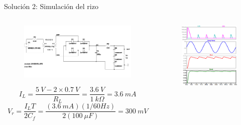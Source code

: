 \documentclass[t,aspectratio=169]{beamer}
\begin{document}
\begin{frame}{Solución 2: Simulación del rizo}
\begin{columns}
\begin{column}{0.6\textwidth}
    \begin{figure}
        \centering
        \includegraphics[width=\textwidth]{figures/fullwave_rectifier_schematic.pdf}
    \end{figure}
    \[ I_{L} = \dfrac{5\ V - 2\times{}0.7\ V}{R_L} = \dfrac{3.6\ V}{1\ k\Omega} = 3.6\ mA \]
    \[ V_r = \dfrac{I_L T}{2 C_f} = \dfrac{(3.6\ mA)(1/60 Hz)}{2 (100\ \mu F)} = 300\ mV \]
\end{column}
\begin{column}{0.4\textwidth}
\begin{figure}
    \centering
    \includegraphics[width=\textwidth]{figures/fullwave_rectifier_ripple_regulation.png}
\end{figure}
\end{column}
\end{columns}
\end{frame}
\end{document}
